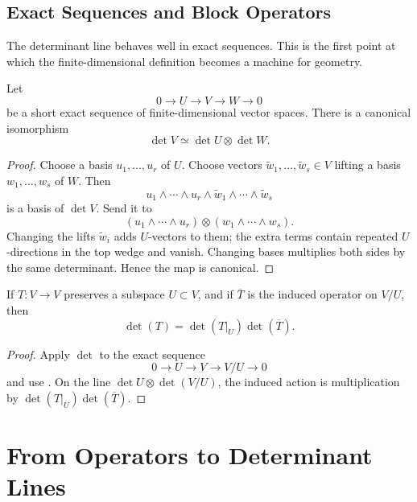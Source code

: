 \documentclass[11pt]{memoir}
\begin{document}
\section{Exact Sequences and Block Operators}
\label{sec:exact-sequences}

The determinant line behaves well in exact sequences. This is the
first point at which the finite-dimensional definition becomes a
machine for geometry.

\begin{proposition}
\label{prop:short-exact-det-line}
Let
\[
  0\longrightarrow U\longrightarrow V\longrightarrow W\longrightarrow 0
\]
be a short exact sequence of finite-dimensional vector spaces. There
is a canonical isomorphism
\[
  \det V\simeq \det U\otimes \det W.
\]
\end{proposition}

\begin{proof}
Choose a basis \(u_1,\dots,u_r\) of \(U\). Choose vectors
\(\widetilde w_1,\dots,\widetilde w_s\in V\) lifting a basis
\(w_1,\dots,w_s\) of \(W\). Then
\[
  u_1\wedge\cdots\wedge u_r\wedge
  \widetilde w_1\wedge\cdots\wedge \widetilde w_s
\]
is a basis of \(\det V\). Send it to
\[
  (u_1\wedge\cdots\wedge u_r)\otimes
  (w_1\wedge\cdots\wedge w_s).
\]
Changing the lifts \(\widetilde w_i\) adds \(U\)-vectors to them; the
extra terms contain repeated \(U\)-directions in the top wedge and
vanish. Changing bases multiplies both sides by the same determinant.
Hence the map is canonical.
\end{proof}

\begin{corollary}
\label{cor:block-triangular}
If \(T:V\to V\) preserves a subspace \(U\subset V\), and if
\(\overline T\) is the induced operator on \(V/U\), then
\[
  \det(T)=\det(T|_U)\det(\overline T).
\]
\end{corollary}

\begin{proof}
Apply \(\det\) to the exact sequence
\[
  0\to U\to V\to V/U\to 0
\]
and use . On the line
\(\det U\otimes\det(V/U)\), the induced action is multiplication by
\(\det(T|_U)\det(\overline T)\).
\end{proof}

\chapter{From Operators to Determinant Lines}
\label{ch:det-lines}
\end{document}
